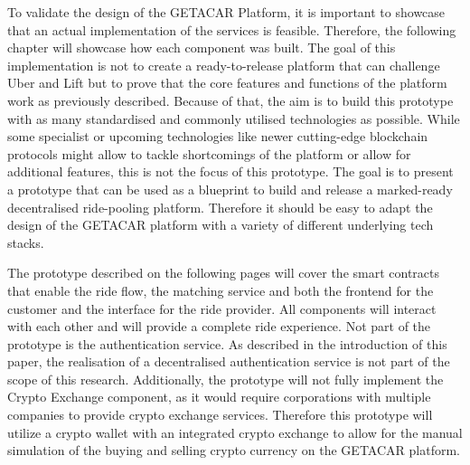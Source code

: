 To validate the design of the GETACAR Platform, it is important to showcase that an actual implementation of the services is feasible. Therefore, the following chapter will showcase how each component was built. The goal of this implementation is not to create a ready-to-release platform that can challenge Uber and Lift but to prove that the core features and functions of the platform work as previously described. Because of that, the aim is to build this prototype with as many standardised and commonly utilised technologies as possible. While some specialist or upcoming technologies like newer cutting-edge blockchain protocols might allow to tackle shortcomings of the platform or allow for additional features, this is not the focus of this prototype. The goal is to present a prototype that can be used as a blueprint to build and release a marked-ready decentralised ride-pooling platform. Therefore it should be easy to adapt the design of the GETACAR platform with a variety of different underlying tech stacks.

The prototype described on the following pages will cover the smart contracts that enable the ride flow, the matching service and both the frontend for the customer and the interface for the ride provider. All components will interact with each other and will provide a complete ride experience. Not part of the prototype is the authentication service. As described in the introduction of this paper, the realisation of a decentralised authentication service is not part of the scope of this research. Additionally, the prototype will not fully implement the Crypto Exchange component, as it would require corporations with multiple companies to provide crypto exchange services. Therefore this prototype will utilize a crypto wallet with an integrated crypto exchange to allow for the manual simulation of the buying and selling crypto currency on the GETACAR platform.
